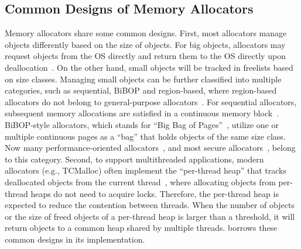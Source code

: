 \subsection{Common Designs of Memory Allocators}
\label{sec:commondesign}

Memory allocators share some common designs. First, most allocators manage objects differently based on the size of objects. For big objects, allocators may request objects from the OS directly and return them to the OS directly upon deallocation~\cite{Hoard}. On the other hand, small objects will be tracked in freelists based on size classes. Managing small objects can be further classified into multiple categories, such as sequential, BiBOP and region-based, where region-based allocators do not belong to general-purpose allocators~\cite{DieHarder, Gay:1998:MME:277650.277748}.
For sequential allocators, subsequent memory allocations are satisfied in a continuous memory block~\cite{Cling}. BiBOP-style allocators, which stands for ``Big Bag of Pages''~\cite{hanson1980portable}, utilize one or multiple continuous pages as a ``bag'' that holds objects of the same size class. 
Now many performance-oriented allocators~\cite{tcmalloc, jemalloc, Scalloc}, and most secure allocators~\cite{openbsd, DieHarder, FreeGuard, Guarder}, belong to this category. Second, to support multithreaded applications, modern allocators (e.g., TCMalloc) often implement the ``per-thread heap'' that tracks deallocated objects from the current thread~\cite{tcmallocnuma}, where allocating objects from per-thread heaps do not need to acquire locks. Therefore, the per-thread heap is expected to reduce the contention between threads. When the number of objects or the size of freed objects of a per-thread heap is larger than a threshold, it will return objects to a common heap shared by multiple threads. \NM{} borrows these common designs in its implementation. 

 